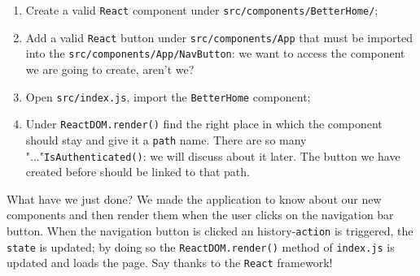 \begin{enumerate}
	\item Create a valid \verb|React| component under \verb|src/components/BetterHome/|;
	\item Add a valid \verb|React| button under \verb|src/components/App| that must be imported into the \verb|src/components/App/NavButton|: we want to access the component we are going to create, aren't we?
	\item Open \verb|src/index.js|, import the \verb|BetterHome| component;
	\item Under \verb|ReactDOM.render()| find the right place in which the component should stay and give it a \verb|path| name. There are so many "..."\verb|IsAuthenticated()|: we will discuss about it later. The button we have created before should be linked to that path.
\end{enumerate}

What have we just done? We made the application to know about our new components and then render them when the user clicks on the navigation bar button. When the navigation button is clicked an history-\verb|action| is triggered, the \verb|state| is updated; by doing so the \verb|ReactDOM.render()| method of \verb|index.js| is updated and loads the page. Say thanks to the \verb|React| framework!


